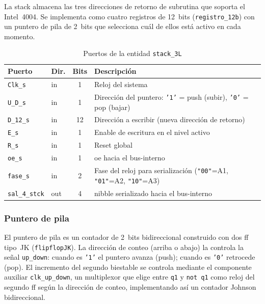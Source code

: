 \documentclass[%
    school=etsisi,%
    type=pfg,%
    degree=61CI,%
]{upm-report}
\newcommand{\vhdlfile}[1]{%
    \par\noindent{\small\sffamily\color{gray}Fichero: \texttt{#1}}\par\smallskip
}
\begin{document}
La \gls{stack} almacena las tres direcciones de retorno de subrutina que
soporta el Intel~4004.  Se implementa como cuatro registros de 12~bits
(\texttt{registro\_12b}) con un puntero de pila de 2~bits que selecciona
cuál de ellos está activo en cada momento.

\begin{table}[H]
\centering
\caption{Puertos de la entidad \texttt{stack\_3L}}
\label{tab:stack}
\begin{tabularx}{\textwidth}{@{}llcX@{}}
\toprule
\textbf{Puerto}   & \textbf{Dir.} & \textbf{Bits} & \textbf{Descripción} \\
\midrule
\texttt{Clk\_s}     & in  & 1  & Reloj del sistema \\
\texttt{U\_D\_s}    & in  & 1  & Dirección del puntero: \texttt{'1'} = push (subir), \texttt{'0'} = pop (bajar) \\
\texttt{D\_12\_s}   & in  & 12 & Dirección a escribir (nueva dirección de retorno) \\
\texttt{E\_s}       & in  & 1  & Enable de escritura en el nivel activo \\
\texttt{R\_s}       & in  & 1  & Reset global \\
\texttt{oe\_s}      & in  & 1  & \acrshort{oe} hacia el \gls{bus-interno} \\
\texttt{fase\_s}    & in  & 2  & Fase del reloj para serialización (\texttt{"00"}=A1, \texttt{"01"}=A2, \texttt{"10"}=A3) \\
\texttt{sal\_4\_stck} & out & 4  & \gls{nibble} serializado hacia el \gls{bus-interno} \\
\bottomrule
\end{tabularx}
\end{table}

\subsubsection{Puntero de pila}
\label{ss:puntero-stack}
\vhdlfile{puntero\_stack.vhd}

El puntero de pila es un contador de 2~bits bidireccional construido con dos
\acrshort{ff} tipo~JK (\texttt{flipflopJK}).  La dirección de conteo (arriba o
abajo) la controla la señal \texttt{up\_down}: cuando es \texttt{'1'} el
puntero avanza (push); cuando es \texttt{'0'} retrocede (pop).  El
incremento del segundo biestable se controla mediante el componente auxiliar
\texttt{clk\_up\_down}, un multiplexor que elige entre \texttt{q1} y
\texttt{not~q1} como reloj del segundo \acrshort{ff} según la dirección de
conteo, implementando así un contador Johnson bidireccional.
\end{document}
